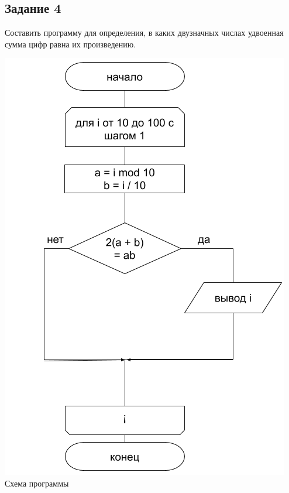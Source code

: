 \documentclass[a4paper,14pt]{extarticle}
\begin{document}
\subsection{Задание 4}
Составить программу для определения, в каких двузначных числах удвоенная сумма цифр равна их произведению.
\begin{center}
\includegraphics[scale=0.6]{lab2-4.png}\\
Схема программы
\end{center}

\end{document}
